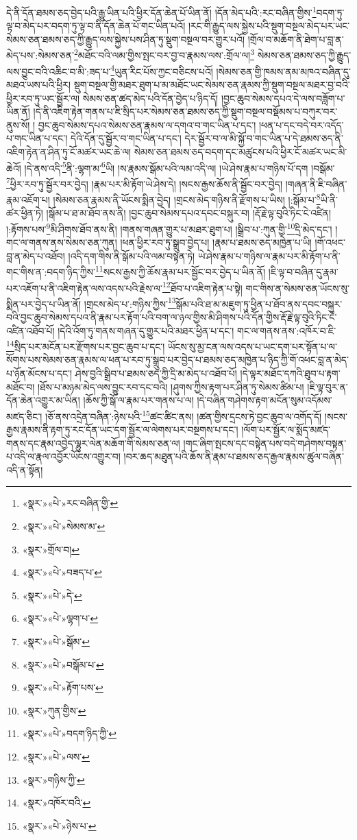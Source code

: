 དེ་ནི་དོན་ཐམས་ཅད་བྱེད་པའི་རྒྱུ་ཡིན་པའི་ཕྱིར་དོན་ཆེན་པོ་ཡིན་ནོ། །དོན་མེད་པའི་:རང་བཞིན་གྱིས་\footnote{«སྣར་»«པེ་»རང་བཞིན་གྱི་}བདག་ཏུ་ལྟ་བ་མེད་པར་བདག་ཏུ་ལྟ་བ་ནི་དོན་ཆེན་པོ་གང་ཡིན་པའོ། །རང་གི་རྒྱུད་ལས་སྐྱེས་པའི་སྡུག་བསྔལ་མེད་པར་ཡང་སེམས་ཅན་ཐམས་ཅད་ཀྱི་རྒྱུད་ལས་སྐྱེས་པས་ཤིན་ཏུ་སྡུག་བསྔལ་བར་གྱུར་པའོ། །གྲོལ་བ་མཆོག་ནི་ཐེག་པ་བླ་ན་མེད་པས་:སེམས་ཅན་\footnote{«སྣར་»«པེ་»སེམས་མ་}མཐོང་བའི་ལམ་གྱིས་སྤང་བར་བྱ་བ་རྣམས་ལས་:གྲོལ་ལ།\footnote{«སྣར་»གྲོལ་བ།} སེམས་ཅན་ཐམས་ཅད་ཀྱི་རྒྱུད་ལས་བྱུང་བའི་འཆིང་བ་མི་:ཟད་པ་\footnote{«སྣར་»«པེ་»བཟད་པ་}ཡུན་རིང་པོས་ཀྱང་བཅིངས་པའོ། །སེམས་ཅན་གྱི་ཁམས་ནམ་མཁའ་བཞིན་དུ་མཐའ་ཡས་པའི་ཕྱིར། སྡུག་བསྔལ་གྱི་མཐར་ཐུག་པ་མ་མཐོང་ཡང་སེམས་ཅན་རྣམས་ཀྱི་སྡུག་བསྔལ་མཐར་བྱ་བའི་ཕྱིར་རབ་ཏུ་ཡང་སྦྱོར་ལ། སེམས་ཅན་ཚད་མེད་པའི་དོན་བྱེད་པ་ཉིད་དོ། །བྱང་ཆུབ་སེམས་དཔའ་དེ་ལས་བཟློག་པ་ཡིན་ནོ། །དེ་ནི་འཇིག་རྟེན་གནས་པ་ཇི་སྲིད་པར་སེམས་ཅན་ཐམས་ཅད་ཀྱི་སྡུག་བསྔལ་བསྡོམས་པ་བཀུར་བར་ནུས་སོ། །
བྱང་ཆུབ་སེམས་དཔའ་སེམས་ཅན་རྣམས་ལ་དགའ་བ་གང་ཡིན་པ་དང་། །ཕན་པ་དང་བདེ་བར་འདོད་པ་གང་ཡིན་པ་དང་། དེའི་དོན་དུ་སྦྱོར་བ་གང་ཡིན་པ་དང་། དེར་སྦྱོར་བ་ལ་མི་སྐྱོ་བ་གང་ཡིན་པ་དེ་ཐམས་ཅད་ནི་འཇིག་རྟེན་ན་ཤིན་ཏུ་ངོ་མཚར་ཡང་ཆེ་ལ། སེམས་ཅན་ཐམས་ཅད་བདག་དང་མཚུངས་པའི་ཕྱིར་ངོ་མཚར་ཡང་མི་ཆེའོ། །དེ་ནས་འདི་\footnote{«སྣར་»«པེ་»དེ་}ནི་:ལྷག་མ་\footnote{«སྣར་»«པེ་»ལྷག་པ་}ཡི། །ས་རྣམས་སྒོམ་པའི་ལམ་འདི་ལ། །ཡེ་ཤེས་རྣམ་པ་གཉིས་པོ་དག །བསྒོམ་\footnote{«སྣར་»«པེ་»སྒོམ་}ཕྱིར་རབ་ཏུ་སྦྱོར་བར་བྱེད། །རྣམ་པར་མི་རྟོག་ཡེ་ཤེས་དེ། །སངས་རྒྱས་ཆོས་ནི་སྦྱོང་བར་བྱེད། །གཞན་ནི་ཇི་བཞིན་རྣམ་འཇོག་པ། །སེམས་ཅན་རྣམས་ནི་ཡོངས་སྨིན་བྱེད། །གྲངས་མེད་གཉིས་ནི་རྫོགས་པ་ཡིས། །:སྒོམ་པ་\footnote{«སྣར་»«པེ་»བསྒོམ་པ་}ཡི་ནི་ཚར་ཕྱིན་ཏེ། །སྒོམ་པ་ཐ་མ་ཐོབ་ནས་ནི། །བྱང་ཆུབ་སེམས་དཔའ་དབང་བསྐུར་བ། །རྡོ་རྗེ་ལྟ་བུའི་ཏིང་ངེ་འཛིན། །:རྟོགས་པས་\footnote{«སྣར་»«པེ་»རྟོག་པས་}མི་ཤིགས་ཐོབ་ནས་ནི། །གནས་གཞན་གྱུར་པ་མཐར་ཐུག་པ། །སྒྲིབ་པ་:ཀུན་གྱི་\footnote{«སྣར་»ཀུན་གྱིས་}དྲི་མེད་དང་། །གང་ལ་གནས་ནས་སེམས་ཅན་ཀུན། །ཕན་ཕྱིར་རབ་ཏུ་སྒྲུབ་བྱེད་པ། །རྣམ་པ་ཐམས་ཅད་མཁྱེན་པ་ཡི། །གོ་འཕང་བླ་ན་མེད་པ་འཐོབ། །འདི་དག་གིས་ནི་སྒོམ་པའི་ལམ་བསྟན་ཏེ། ཡེ་ཤེས་རྣམ་པ་གཉིས་ལ་རྣམ་པར་མི་རྟོག་པ་ནི་གང་གིས་ན་:བདག་ཉིད་ཀྱིས་\footnote{«སྣར་»«པེ་»བདག་ཉིད་ཀྱི་}སངས་རྒྱས་ཀྱི་ཆོས་རྣམ་པར་སྦྱོང་བར་བྱེད་པ་ཡིན་ནོ། །ཇི་ལྟ་བ་བཞིན་དུ་རྣམ་པར་འཇོག་པ་ནི་འཇིག་རྟེན་ལས་འདས་པའི་རྗེས་ལ་\footnote{«སྣར་»«པེ་»ལས་}ཐོབ་པ་འཇིག་རྟེན་པ་སྟེ། གང་གིས་ན་སེམས་ཅན་ཡོངས་སུ་སྨིན་པར་བྱེད་པ་ཡིན་ནོ། །གྲངས་མེད་པ་:གཉིས་ཀྱིས་\footnote{«སྣར་»གཉིས་ཀྱི་}སྒོམ་པའི་ཐ་མ་མཇུག་ཏུ་ཕྱིན་པ་ཐོབ་ནས་དབང་བསྐུར་བའི་བྱང་ཆུབ་སེམས་དཔའ་ནི་རྣམ་པར་རྟོག་པའི་བག་ལ་ཉལ་གྱིས་མི་ཤིགས་པའི་དོན་གྱིས་རྡོ་རྗེ་ལྟ་བུའི་ཏིང་ངེ་འཛིན་འཐོབ་པོ། །དེའི་འོག་ཏུ་གནས་གཞན་དུ་གྱུར་པའི་མཐར་ཕྱིན་པ་དང་། གང་ལ་གནས་ནས་:འཁོར་བ་ཇི་\footnote{«སྣར་»འཁོར་བའི་}སྲིད་པར་མངོན་པར་རྫོགས་པར་བྱང་ཆུབ་པ་དང་། ཡོངས་སུ་མྱ་ངན་ལས་འདས་པ་ཡང་དག་པར་སྟོན་པ་ལ་སོགས་པས་སེམས་ཅན་རྣམས་ལ་ཕན་པ་རབ་ཏུ་སྒྲུབ་པར་བྱེད་པ་ཐམས་ཅད་མཁྱེན་པ་ཉིད་ཀྱི་གོ་འཕང་བླ་ན་མེད་པ་ཉོན་མོངས་པ་དང་། ཤེས་བྱའི་སྒྲིབ་པ་ཐམས་ཅད་ཀྱི་དྲི་མ་མེད་པ་འཐོབ་པོ། །དེ་ལྟར་མཐོང་དཀའི་ཐུབ་པ་རྟག་མཐོང་བ། །ཐོས་པ་མཉམ་མེད་ལས་བྱུང་རབ་དང་བའི། །ཤུགས་ཀྱིས་རྟག་པར་ཤིན་ཏུ་སེམས་ཚིམ་པ། །ཇི་ལྟ་བུར་ན་དོན་ཆེན་འགྱུར་མ་ཡིན། །ཆོས་ཀྱི་སྒོ་ལ་རྣམ་པར་གནས་པ་ལ། །དེ་བཞིན་གཤེགས་རྟག་མངོན་སུམ་འདོམས་མཛད་ཅིང་། །ཅོ་ནས་འདྲེན་བཞིན་:ཉེས་པའི་\footnote{«སྣར་»«པེ་»ཉེས་པ་}ཚང་ཚིང་ནས། །ཚན་གྱིས་དྲངས་ཏེ་བྱང་ཆུབ་ལ་འགོད་དོ། །སངས་རྒྱས་རྣམས་ནི་རྟག་ཏུ་རང་དོན་ཡང་དག་སྦྱོར་ལ་ལེགས་པར་བསྔགས་པ་དང་། །ལོག་པར་སྦྱོར་ལ་སྨོད་མཛད་གནས་དང་རྣམ་འབྱེད་ལྷུར་ལེན་མཆོག་གི་སེམས་ཅན་ལ། །གང་ཞིག་སྤངས་དང་བསྟེན་པས་བདེ་གཤེགས་བསྟན་པ་འདི་ལ་རྣལ་འབྱོར་ཡོངས་འགྱུར་བ། །བར་ཆད་མཐུན་པའི་ཆོས་ནི་རྣམ་པ་ཐམས་ཅད་རྒྱལ་རྣམས་ཚུལ་བཞིན་འདི་ན་སྟོན། 